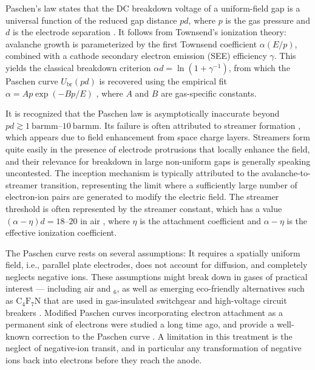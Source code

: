 \documentclass{iopjournal}
\newcommand{\SF}{\text{SF}$_6$}
\begin{document}
Paschen's law \cite{Paschen1889} states that the DC breakdown voltage of a uniform-field gap is a universal function of the reduced gap distance $pd$, where $p$ is the gas pressure and $d$ is the electrode separation \cite{Raizer1991, Kuffel2000}.
It follows from Townsend's ionization theory: avalanche growth is parameterized by the first Townsend coefficient $\alpha(E/p)$, combined with a cathode secondary electron emission (SEE) efficiency $\gamma$.
This yields the classical breakdown criterion $\alpha d = \ln(1 + \gamma^{-1})$, from which the Paschen curve $U_\text{br}(pd)$ is recovered using the empirical fit $\alpha = Ap\exp(-Bp/E)$ \cite{Raizer1991}, where $A$ and $B$ are gas-specific constants.

It is recognized that the Paschen law is asymptotically inaccurate beyond $pd \gtrsim \SIrange{1}{10}{\bar\milli\meter}$.
Its failure is often attributed to streamer formation \cite{Meek1940}, which appears due to field enhancement from space charge layers.
Streamers \cite{Nijdam2020} form quite easily in the presence of electrode protrusions that locally enhance the field, and their relevance for breakdown in large non-uniform gaps is generally speaking uncontested.
The inception mechanism is typically attributed to the avalanche-to-streamer transition, representing the limit where a sufficiently large number of electron-ion pairs are generated to modify the electric field.
The streamer threshold is often represented by the streamer constant, which has a value $(\alpha-\eta) d = \numrange{18}{20}$ in air \cite{Raether1939,Meek1940}, where $\eta$ is the attachment coefficient and $\alpha-\eta$ is the effective ionization coefficient.

The Paschen curve rests on several assumptions: It requires a spatially uniform field, i.e., parallel plate electrodes, does not account for diffusion, and completely neglects negative ions.
These assumptions might break down in gases of practical interest --- including air and \SF, as well as emerging eco-friendly alternatives such as $\text{C}_4\text{F}_7\text{N}$ that are used in gas-insulated switchgear and high-voltage circuit breakers \cite{Rabie2018}.
Modified Paschen curves incorporating electron attachment as a permanent sink of electrons were studied a long time ago, and provide a well-known correction to the Paschen curve \cite{Raizer1991}.
A limitation in this treatment is the neglect of negative-ion transit, and in particular any transformation of negative ions back into electrons before they reach the anode.
\end{document}
